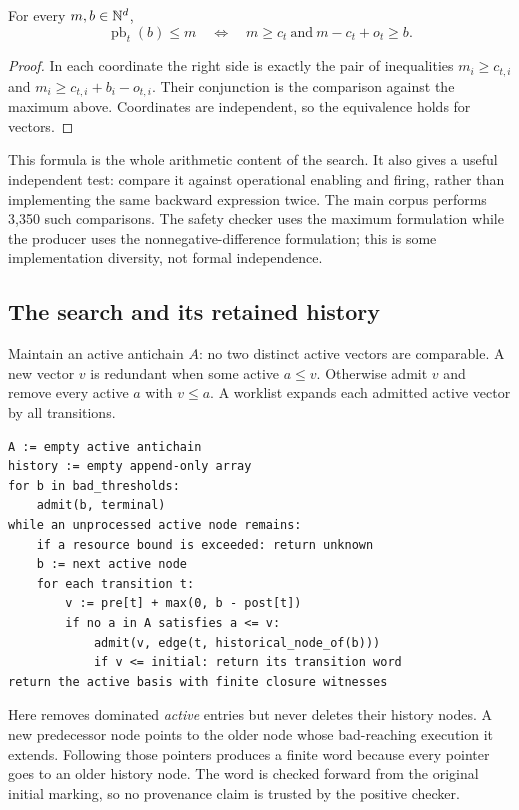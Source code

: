 \begin{lemma}
\label{lem:pred}
For every $m,b\in\mathbb N^d$,
\[
 \operatorname{pb}_t(b)\le m
 \quad\Longleftrightarrow\quad
 m\ge c_t\ \text{and}\ m-c_t+o_t\ge b.
\]
\end{lemma}
\begin{proof}
In each coordinate the right side is exactly the pair of inequalities
$m_i\ge c_{t,i}$ and $m_i\ge c_{t,i}+b_i-o_{t,i}$. Their conjunction is the comparison against the maximum above. Coordinates are independent, so the equivalence holds for vectors.
\end{proof}

This formula is the whole arithmetic content of the search. It also gives a useful independent test: compare it against operational enabling and firing, rather than implementing the same backward expression twice. The main corpus performs 3,350 such comparisons. The safety checker uses the maximum formulation while the producer uses the nonnegative-difference formulation; this is some implementation diversity, not formal independence.

\subsection{The search and its retained history}
Maintain an active antichain $A$: no two distinct active vectors are comparable. A new vector $v$ is redundant when some active $a\le v$. Otherwise admit $v$ and remove every active $a$ with $v\le a$. A worklist expands each admitted active vector by all transitions.

\begin{lstlisting}
A := empty active antichain
history := empty append-only array
for b in bad_thresholds:
    admit(b, terminal)
while an unprocessed active node remains:
    if a resource bound is exceeded: return unknown
    b := next active node
    for each transition t:
        v := pre[t] + max(0, b - post[t])
        if no a in A satisfies a <= v:
            admit(v, edge(t, historical_node_of(b)))
            if v <= initial: return its transition word
return the active basis with finite closure witnesses
\end{lstlisting}

Here  removes dominated \emph{active} entries but never deletes their history nodes. A new predecessor node points to the older node whose bad-reaching execution it extends. Following those pointers produces a finite word because every pointer goes to an older history node. The word is checked forward from the original initial marking, so no provenance claim is trusted by the positive checker.

